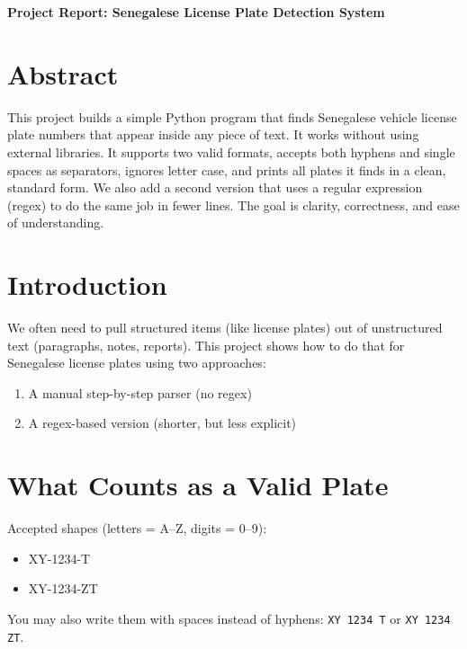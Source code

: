 \documentclass[12pt,a4paper]{article}
\begin{document}
\begin{center}
    \Large \textbf{Project Report: Senegalese License Plate Detection System}
    \author{
    \textbf{Group 11} \\
    Alliance IRIGENERA (Group Leader) \\
    Maryam Yahya MOHAMED \\
    Olusola Timothy OGUNDEPO \\
    Jean Baptiste HABINEZA
    \vspace{-0.5cm}
}
\end{center}
\section*{Abstract}
This project builds a simple Python program that finds Senegalese vehicle license plate numbers that appear inside any piece of text. It works without using external libraries. It supports two valid formats, accepts both hyphens and single spaces as separators, ignores letter case, and prints all plates it finds in a clean, standard form. We also add a second version that uses a regular expression (regex) to do the same job in fewer lines. The goal is clarity, correctness, and ease of understanding.
\section{Introduction}
We often need to pull structured items (like license plates) out of unstructured text (paragraphs, notes, reports). This project shows how to do that for Senegalese license plates using two approaches:
\begin{enumerate}
    \item A manual step-by-step parser (no regex)
    \item A regex-based version (shorter, but less explicit)
\end{enumerate}
\section{What Counts as a Valid Plate}
Accepted shapes (letters = A–Z, digits = 0–9):
\begin{itemize}
    \item XY-1234-T
    \item XY-1234-ZT
\end{itemize}

\noindent You may also write them with spaces instead of hyphens: \texttt{XY 1234 T} or \texttt{XY 1234 ZT}.
\vspace{6pt}
\end{document}
